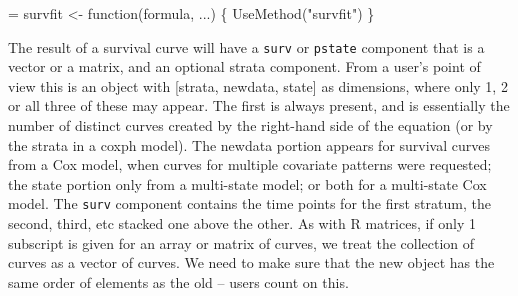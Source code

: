 \documentclass{article}
\newcommand{\code}[1]{\texttt{#1}}
\begin{document}
\begin{nwchunk}
=
 survfit <- function(formula, ...) \{
     UseMethod("survfit")
 \}
 
\end{nwchunk}

The result of a survival curve will have a \code{surv} or \code{pstate}
component that is a vector or a matrix, and an optional strata component.
From a user's point of view this is an object with [strata, newdata, state]
as dimensions, where only 1, 2 or all three of these may appear.
The first is always present, and is essentially the number of distinct
curves created by the right-hand side of the equation (or by the strata in
a coxph model).
The newdata portion appears for survival curves from a Cox model, when curves
for multiple covariate patterns were requested;
the state portion only from a multi-state model; or both for a multi-state
Cox model. 
The \code{surv} component contains the time points for the first stratum,
the second, third, etc stacked one above the other.  
As with R matrices, if only 1 subscript is given for an array or matrix of
curves, we treat the collection of curves as a vector of curves.
We need to make sure that the new object has the same order of elements as
the old -- users count on this.
\end{document}
